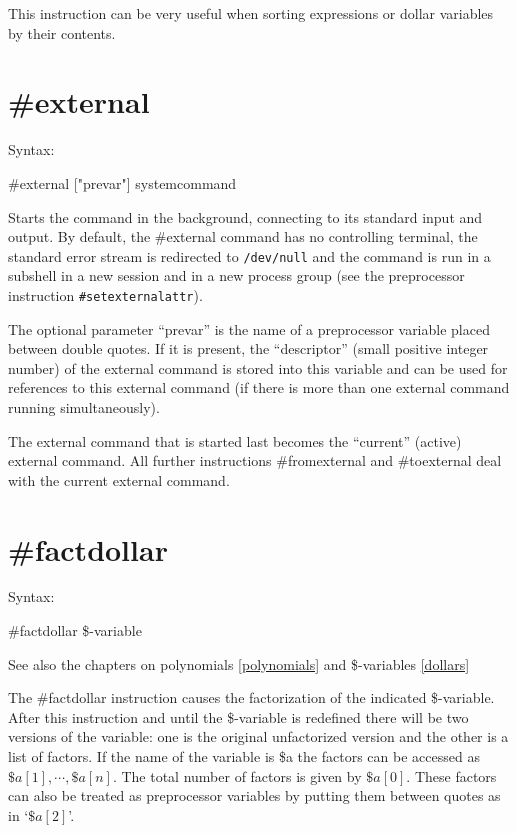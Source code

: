 This instruction can be very useful when sorting expressions or dollar 
variables by their contents.


\section{\#external}
\label{preexternal}

\noindent Syntax:

\#external ["prevar"] systemcommand

\noindent Starts the command in the background, 
connecting to its standard 
input and output. By default, 
the \#external command has no controlling terminal, the standard error stream 
is redirected to \verb|/dev/null| and the command is run in a subshell in a 
new session and in a new process group (see the preprocessor instruction 
\verb|#setexternalattr|).

The optional parameter ``prevar'' is the name of a preprocessor variable 
placed between double quotes. If it is present, the ``descriptor'' (small 
positive integer number) of the external command is stored into this 
variable and can be used for references to this external command (if there 
is more than one external command running simultaneously).

The external command that is started last becomes the ``current'' (active) 
external command.  All further instructions 
\#fromexternal and \#toexternal 
deal with the current external command.


\section{\#factdollar}
\label{prefactdollar}

\noindent Syntax:

\#factdollar \$-variable
 
\noindent See also the chapters on polynomials \ref{polynomials} and 
\$-variables \ref{dollars}

\noindent The \#factdollar instruction causes the 
factorization of the indicated \$-variable. After this instruction and 
until the \$-variable is redefined there will be two versions of the 
variable: one is the original unfactorized version and the other is a list 
of factors. If the name of the variable is \$a the factors can be accessed 
as $\$a[1],\cdots,\$a[n]$. The total number of factors is given by 
$\$a[0]$. These factors can also be treated as preprocessor variables by 
putting them between quotes as in `$\$a[2]$'.

